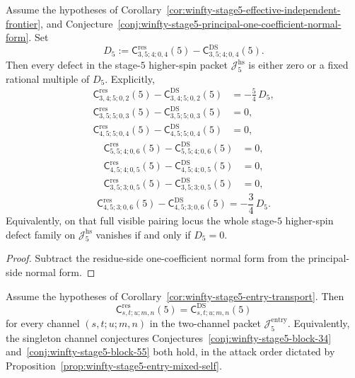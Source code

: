 \begin{corollary}
\label{cor:winfty-stage5-one-defect-family}
Assume the hypotheses of
Corollary~\ref{cor:winfty-stage5-effective-independent-frontier},
and
Conjecture~\ref{conj:winfty-stage5-principal-one-coefficient-normal-form}.
Set
\[
D_5:=
\mathsf{C}^{\mathrm{res}}_{3,5;4;0,4}(5)
-
\mathsf{C}^{\mathrm{DS}}_{3,5;4;0,4}(5).
\]
Then every defect in the stage-$5$ higher-spin packet
\(\mathcal{J}_5^{\mathrm{hs}}\) is either zero or a fixed rational
multiple of \(D_5\).  Explicitly,
\[
\begin{aligned}
\mathsf{C}^{\mathrm{res}}_{3,4;5;0,2}(5)
-
\mathsf{C}^{\mathrm{DS}}_{3,4;5;0,2}(5)
&=
-\frac{5}{4}\,D_5,\\
\mathsf{C}^{\mathrm{res}}_{3,5;5;0,3}(5)
-
\mathsf{C}^{\mathrm{DS}}_{3,5;5;0,3}(5)
&=0,\\
\mathsf{C}^{\mathrm{res}}_{4,5;5;0,4}(5)
-
\mathsf{C}^{\mathrm{DS}}_{4,5;5;0,4}(5)
&=0,
\end{aligned}
\]
\[
\begin{aligned}
\mathsf{C}^{\mathrm{res}}_{5,5;4;0,6}(5)
-
\mathsf{C}^{\mathrm{DS}}_{5,5;4;0,6}(5)
&=0,\\
\mathsf{C}^{\mathrm{res}}_{4,5;4;0,5}(5)
-
\mathsf{C}^{\mathrm{DS}}_{4,5;4;0,5}(5)
&=0,\\
\mathsf{C}^{\mathrm{res}}_{3,5;3;0,5}(5)
-
\mathsf{C}^{\mathrm{DS}}_{3,5;3;0,5}(5)
&=0,
\end{aligned}
\]
\[
\mathsf{C}^{\mathrm{res}}_{4,5;3;0,6}(5)
-
\mathsf{C}^{\mathrm{DS}}_{4,5;3;0,6}(5)
=
-\frac{3}{4}\,D_5.
\]
Equivalently, on that full visible pairing locus the whole stage-$5$
higher-spin defect family on \(\mathcal{J}_5^{\mathrm{hs}}\) vanishes
if and only if \(D_5=0\).
\end{corollary}

\begin{proof}
Subtract the residue-side one-coefficient normal form from the principal-side normal form.
\end{proof}

\begin{conjecture}
\label{conj:winfty-stage5-entry-identities}
\ClaimStatusConjectured{}
Assume the hypotheses of
Corollary~\ref{cor:winfty-stage5-entry-transport}.  Then
\[
\mathsf{C}^{\mathrm{res}}_{s,t;u;m,n}(5)
=
\mathsf{C}^{\mathrm{DS}}_{s,t;u;m,n}(5)
\]
for every channel $(s,t;u;m,n)$ in the two-channel packet
$\mathcal{J}_5^{\mathrm{entry}}$.  Equivalently, the singleton channel
conjectures
Conjectures~\ref{conj:winfty-stage5-block-34}
and~\ref{conj:winfty-stage5-block-55}
both hold, in the attack order dictated by
Proposition~\ref{prop:winfty-stage5-entry-mixed-self}.
\end{conjecture}

